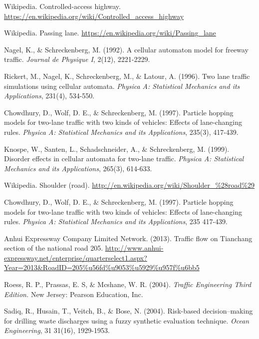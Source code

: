 \documentclass[a4paper,12pt]{article}%
\begin{document}
\begin{thebibliography}{99}

Wikipedia. \newblock Controlled-access highway.
\newblock \url{https://en.wikipedia.org/wiki/Controlled_access_highway}

Wikipedia. \newblock Passing lane.
\newblock \url{https://en.wikipedia.org/wiki/Passing_lane}

Nagel, K., $\&$ Schreckenberg, M.
\newblock (1992).
\newblock A cellular automaton model for freeway traffic.
\newblock \emph{Journal de Physique I}, 2(12), 2221-2229.

Rickert, M., Nagel, K., Schreckenberg, M., $\&$ Latour, A.
\newblock (1996).
\newblock Two lane traffic simulations using cellular automata.
\newblock \emph{ Physica A: Statistical Mechanics and its Applications}, 231(4), 534-550.

Chowdhury, D., Wolf, D. E., $\&$ Schreckenberg, M.
\newblock (1997).
\newblock  Particle hopping models for two-lane traffic with two kinds of vehicles: Effects of lane-changing rules.
\newblock \emph{Physica A: Statistical Mechanics and its Applications}, 235(3), 417-439.

Knospe, W., Santen, L., Schadschneider, A., $\&$ Schreckenberg, M.
\newblock (1999).
\newblock Disorder effects in cellular automata for two-lane traffic.
\newblock \emph{Physica A: Statistical Mechanics and its Applications}, 265(3), 614-633.

Wikipedia. \newblock Shoulder (road).
\newblock \url{http://en.wikipedia.org/wiki/Shoulder_%28road%29}

Chowdhury, D., Wolf, D. E., $\&$ Schreckenberg, M.
\newblock (1997).
\newblock Particle hopping models for two-lane traffic with two kinds
of vehicles: Effects of lane-changing rules.
\newblock \emph{Physica A: Statistical Mechanics and its Applications}, 235 417-439.

Anhui Expressway Company Limited Network. \newblock (2013).
\newblock Traffic flow on Tianchang section of the  national road 205.
\newblock \url{http://www.anhui-expressway.net/enterprise/quarterselect1.aspx?Year=2013&RoadID=205%u56fd%u9053%u5929%u957f%u6bb5}

Roess, R. P., Prassas, E. S, $\&$ Mcshane, W. R.
\newblock (2004).
\newblock \emph{Traffic Engineering Third Edition.}
\newblock New Jersey: Pearson Education, Inc.

Sadiq, R., Husain, T., Veitch, B., $\&$ Bose, N.
\newblock (2004).
\newblock Risk-based decision--making for drilling waste
discharges using a fuzzy synthetic evaluation technique.
\newblock \emph{Ocean Engineering}, 31 31(16), 1929-1953.

\end{thebibliography}
\end{document}
